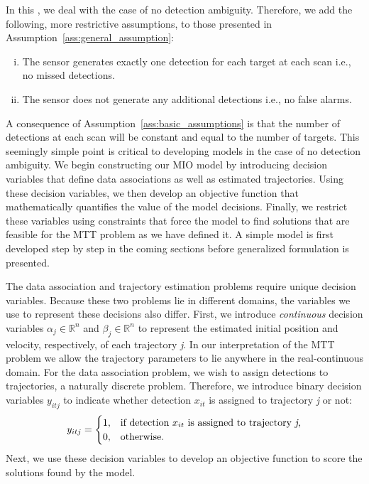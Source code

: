 In this \mytitle, we deal with the case of no detection ambiguity. Therefore, we add the following, more restrictive assumptions, to those presented in Assumption~\ref{ass:general_assumption}:

\begin{assumption}\label{ass:basic_assumptions}
\leavevmode
\begin{enumerate}[(i)]
\item The sensor generates exactly one detection for each target
 at each scan i.e., no missed detections.
\item The sensor does not generate any additional detections
i.e., no false alarms.
\end{enumerate}
\end{assumption}
A consequence of Assumption~\ref{ass:basic_assumptions} is that the number of detections at each scan will be constant and equal to the number of targets. This seemingly simple point is critical to developing models in the case of no detection ambiguity. We begin constructing our MIO model by introducing decision variables that define data associations as well as estimated trajectories. Using these decision variables, we then develop an objective function that  mathematically quantifies the value of the model decisions. Finally, we restrict these variables using constraints that force the model to find solutions that are feasible for the MTT problem as we have defined it. A simple model is first developed step by step in the coming sections before generalized formulation is presented. 

The data association and trajectory estimation problems require unique decision variables. Because these two problems lie in different domains, the variables we use to represent these decisions also differ. First, we introduce \textit{continuous} decision variables $\alpha_{j} \in \mathbb{R}^n$ and $\beta_{j} \in \mathbb{R}^n$ to represent the estimated initial position and velocity, respectively, of each trajectory \textit{j}. In our interpretation of the MTT problem we allow the trajectory parameters to lie anywhere in the real-continuous domain. For the data association problem, we wish to assign detections to trajectories, a naturally discrete problem. Therefore, we introduce binary decision variables $y_{itj}$ to indicate whether detection $x_{it}$ is assigned to trajectory \textit{j} or not:
\begin{align}
y_{itj} =
\begin{cases}
1, & \text{if detection $x_{it}$ is assigned to trajectory \textit{j},} \\
0, & \text{otherwise.}
\end{cases}
\end{align}
Next, we use these decision variables to develop an objective function to score the solutions found by the model. 


